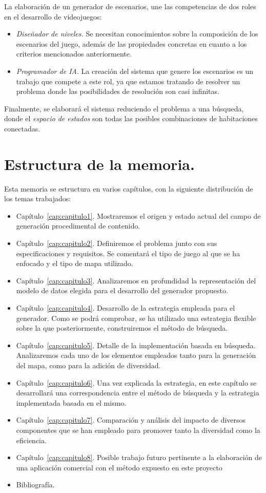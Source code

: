 La elaboración de un generador de escenarios, une las competencias de dos roles en el desarrollo de videojuegos:

\begin{itemize}
	\item \emph{Diseñador de niveles.} Se necesitan conocimientos sobre la composición de los escenarios del juego, además de las propiedades concretas en cuanto a los criterios mencionados anteriormente.
	\item \emph{Programador de IA}. La creación del sistema que genere los escenarios es un trabajo que compete a este rol, ya que estamos tratando de resolver un problema donde las posibilidades de resolución son casi infinitas.
\end{itemize}

Finalmente, se elaborará el sistema reduciendo el problema a una búsqueda, donde el \emph{espacio de estados} son todas las posibles combinaciones de habitaciones conectadas.

\section*{Estructura de la memoria.}

Esta memoria se estructura en varios capítulos, con la siguiente distribución de los temas trabajados:

\begin{itemize}
	\item Capítulo~\ref{cap:capitulo1}. Mostraremos el origen y estado actual del campo de generación procedimental de contenido.
	\item Capítulo~\ref{cap:capitulo2}. Definiremos el problema junto con sus especificaciones y requisitos. Se comentará el tipo de juego al que se ha enfocado y el tipo de mapa utilizado.
	\item Capítulo~\ref{cap:capitulo3}. Analizaremos en profundidad la representación del modelo de datos elegida para el desarrollo del generador propuesto.
	\item Capítulo~\ref{cap:capitulo4}. Desarrollo de la estrategia empleada para el generador. Como se podrá comprobar, se ha utilizado una estrategia flexible sobre la que posteriormente, construiremos el método de búsqueda.
	\item Capítulo~\ref{cap:capitulo5}. Detalle de la implementación basada en búsqueda. Analizaremos cada uno de los elementos empleados tanto para la generación del mapa, como para la adición de diversidad.
	\item Capítulo~\ref{cap:capitulo6}. Una vez explicada la estrategia, en este capítulo se desarrollará una correspondencia entre el método de búsqueda y la estrategia implementada basada en el mismo.
	\item Capítulo~\ref{cap:capitulo7}. Comparación y análisis del impacto de diversos componentes que se han empleado para promover tanto la diversidad como la eficiencia.
	\item Capítulo~\ref{cap:capitulo8}. Posible trabajo futuro pertinente a la elaboración de una aplicación comercial con el método expuesto en este proyecto
	\item Bibliografía.
\end{itemize}
